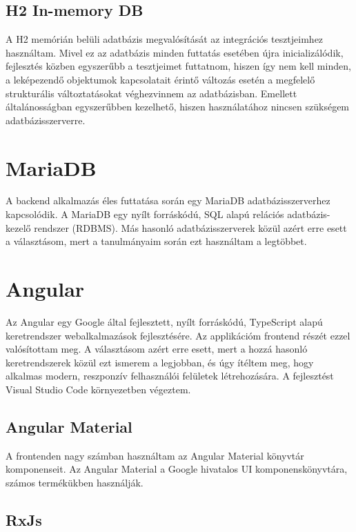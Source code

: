 \documentclass[a4paper,12pt]{report}
\theoremstyle{definition}
\theoremstyle{remark}
\begin{document}
	\subsection{H2 In-memory DB}

A H2\cite{H2website} memórián belüli adatbázis megvalósítását az integrációs tesztjeimhez használtam. Mivel ez az adatbázis minden futtatás esetében újra inicializálódik, fejlesztés közben egyszerűbb a tesztjeimet futtatnom, hiszen így nem kell minden, a leképezendő objektumok kapcsolatait érintő változás esetén a megfelelő strukturális változtatásokat véghezvinnem az adatbázisban. Emellett általánosságban egyszerűbben kezelhető, hiszen használatához nincsen szükségem adatbázisszerverre.

\section{MariaDB}

A backend alkalmazás éles futtatása során egy MariaDB\cite{Mariawebsite} adatbázisszerverhez kapcsolódik. A MariaDB egy nyílt forráskódú, SQL alapú relációs adatbázis-kezelő rendszer (RDBMS). Más hasonló adatbázisszerverek közül azért erre esett a választásom, mert a tanulmányaim során ezt használtam a legtöbbet.

\section{Angular}

Az Angular\cite{Angularwebsite} egy Google által fejlesztett, nyílt forráskódú, TypeScript alapú keretrendszer webalkalmazások fejlesztésére. Az applikációm frontend részét ezzel valósítottam meg. A választásom azért erre esett, mert a hozzá hasonló keretrendszerek közül ezt ismerem a legjobban, és úgy ítéltem meg, hogy alkalmas modern, reszponzív felhasználói felületek létrehozására. A fejlesztést Visual Studio Code\cite{VSCwebsite} környezetben végeztem.

	\subsection{Angular Material}

A frontenden nagy számban használtam az Angular Material\cite{Materialwebsite} könyvtár komponenseit. Az Angular Material a Google hivatalos UI komponenskönyvtára, számos termékükben használják.

	\subsection{RxJs}
\end{document}
